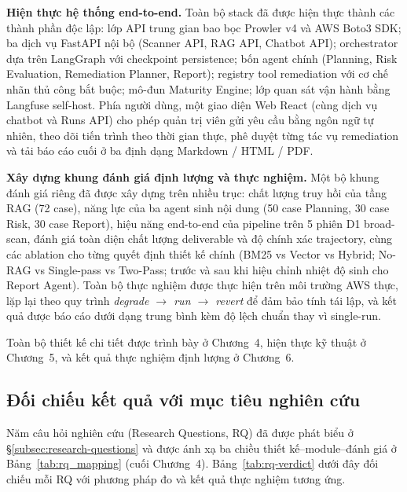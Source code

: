 \textbf{Hiện thực hệ thống end-to-end.} Toàn bộ stack đã được hiện thực thành các thành phần độc lập: lớp API trung gian bao bọc Prowler v4 và AWS Boto3 SDK; ba dịch vụ FastAPI nội bộ (Scanner API, RAG API, Chatbot API); orchestrator dựa trên LangGraph với checkpoint persistence; bốn agent chính (Planning, Risk Evaluation, Remediation Planner, Report); registry tool remediation với cơ chế nhãn thủ công bắt buộc; mô-đun Maturity Engine; lớp quan sát vận hành bằng Langfuse self-host. Phía người dùng, một giao diện Web React (cùng dịch vụ chatbot và Runs API) cho phép quản trị viên gửi yêu cầu bằng ngôn ngữ tự nhiên, theo dõi tiến trình theo thời gian thực, phê duyệt từng tác vụ remediation và tải báo cáo cuối ở ba định dạng Markdown / HTML / PDF.

\textbf{Xây dựng khung đánh giá định lượng và thực nghiệm.} Một bộ khung đánh giá riêng đã được xây dựng trên nhiều trục: chất lượng truy hồi của tầng RAG (72 case), năng lực của ba agent sinh nội dung (50 case Planning, 30 case Risk, 30 case Report), hiệu năng end-to-end của pipeline trên 5 phiên D1 broad-scan, đánh giá toàn diện chất lượng deliverable và độ chính xác trajectory, cùng các ablation cho từng quyết định thiết kế chính (BM25 vs Vector vs Hybrid; No-RAG vs Single-pass vs Two-Pass; trước và sau khi hiệu chỉnh nhiệt độ sinh cho Report Agent). Toàn bộ thực nghiệm được thực hiện trên môi trường AWS thực, lặp lại theo quy trình \textit{degrade $\rightarrow$ run $\rightarrow$ revert} để đảm bảo tính tái lập, và kết quả được báo cáo dưới dạng trung bình kèm độ lệch chuẩn thay vì single-run.

Toàn bộ thiết kế chi tiết được trình bày ở Chương~4, hiện thực kỹ thuật ở Chương~5, và kết quả thực nghiệm định lượng ở Chương~6.

\subsection{Đối chiếu kết quả với mục tiêu nghiên cứu}
\label{subsec:rq-verdict}

Năm câu hỏi nghiên cứu (Research Questions, RQ) đã được phát biểu ở §\ref{subsec:research-questions} và được ánh xạ ba chiều thiết kế--module--đánh giá ở Bảng~\ref{tab:rq_mapping} (cuối Chương~4). Bảng~\ref{tab:rq-verdict} dưới đây đối chiếu mỗi RQ với phương pháp đo và kết quả thực nghiệm tương ứng.

